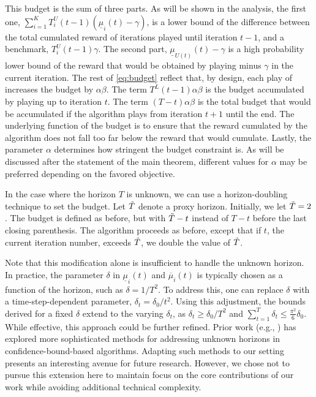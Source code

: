 This budget is the sum of three parts. As will be shown in the analysis, the first one, $\sum_{i=1}^{K}T_i^U(t-1)(\underline{\mu}_i(t)-\gamma)$, is a lower bound of the difference between the total cumulated reward of \algucb iterations played until iteration $t-1$, and a benchmark, $T^U_i(t-1)\gamma$. The second part, $\underline{\mu}_{U(t)}(t)-\gamma$ is a high probability lower bound of the reward that would be obtained by playing \algucb minus $\gamma$ in the current iteration. The rest of \eqref{eq:budget} reflect that, by design, each play of \alglcb increases the budget by $\alpha\beta$. The term $T^{L}(t-1) \alpha \beta$ is the budget accumulated by playing \alglcb up to iteration $t$. The term $(T-t)\alpha \beta$ is the total budget that would be accumulated if the algorithm plays \alglcb from iteration $t+1$ until the end. The underlying function of the budget is to ensure that the reward cumulated by the algorithm does not fall too far below the reward that \alglcb would cumulate.
Lastly, the parameter $\alpha$ determines how stringent the budget constraint is. As will be discussed after the statement of the main theorem, different values for $\alpha$ may be preferred depending on the favored objective.

In the case where the horizon $T$ is unknown, we can use a horizon-doubling technique to set the budget.  Let $\Tilde{T}$ denote a proxy horizon. Initially, we let $\Tilde{T}=2$. The budget is defined as before, but with $\Tilde{T}-t$ instead of $T-t$ before the last closing parenthesis. The algorithm proceeds as before, except that if $t$, the current iteration number, exceeds $\Tilde{T}$, we double the value of $\Tilde{T}$. 

Note that this modification alone is insufficient to handle the unknown horizon. In practice, the parameter $\delta$ in $\underline{\mu}_i(t)$ and $\overline{\mu}_i(t)$ is typically chosen as a function of the horizon, such as $\delta = 1/T^2$. To address this, one can replace $\delta$ with a time-step-dependent parameter, $\delta_t = \delta_0 / t^2$. Using this adjustment, the bounds derived for a fixed $\delta$ extend to the varying $\delta_t$, as $\delta_t \geq \delta_0 / T^2$ and $\sum_{t=1}^T \delta_t \leq \frac{\pi^2}{6} \delta_0$.
While effective, this approach could be further refined. Prior work (e.g., \citet{lattimore2016regretanalysisanytimeoptimally}) has explored more sophisticated methods for addressing unknown horizons in confidence-bound-based algorithms. Adapting such methods to our setting presents an interesting avenue for future research. However, we chose not to pursue this extension here to maintain focus on the core contributions of our work while avoiding additional technical complexity.

